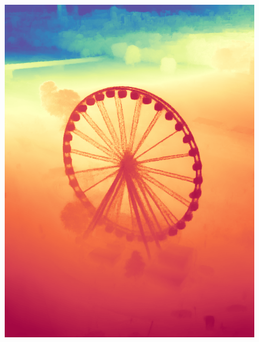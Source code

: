 \documentclass[12pt, letterpaper]{article}
\begin{document}
\begin{figure}[!ht]
\begin{minipage}{0.22\textwidth}
        \includegraphics[width=\textwidth]{example_4_pred_colored}

\end{minipage}
\end{figure}
\end{document}
